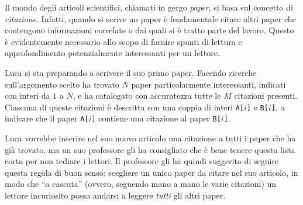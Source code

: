 \usepackage{xcolor}
\usepackage{afterpage}
\usepackage{pifont,mdframed}
\usepackage[bottom]{footmisc}



\newcommand{\inputfile}{\texttt{input.txt}}
\newcommand{\outputfile}{\texttt{output.txt}}

\newenvironment{warning}
  {\par\begin{mdframed}[linewidth=2pt,linecolor=gray]%
    \begin{list}{}{\leftmargin=1cm
                   \labelwidth=\leftmargin}\item[\Large\ding{43}]}
  {\end{list}\end{mdframed}\par}

\newcommand{\funcitem}[2]{\item[$\blacksquare$] \textbf{\large \textsf{Funzione} \texttt{#1}} \vspace{-0.3cm} \begin{center}\begin{tabularx}{\textwidth}{|c|X|} \hline #2 \hline \end{tabularx}\end{center}}



        Il mondo degli articoli scientifici, chiamati in gergo \emph{paper}, si basa sul concetto di \emph{citazione}. Infatti, quando si scrive un paper è fondamentale citare altri paper che contengono informazioni correlate o dai quali si è tratto parte del lavoro. Questo è evidentemente necessario allo scopo di fornire spunti di lettura e approfondimento potenzialmente interessanti per un lettore.

        Luca si sta preparando a scrivere il suo primo paper. Facendo ricerche sull'argomento scelto ha trovato $N$ paper particolarmente interessanti, indicati con interi da $1$ a $N$, e ha catalogato con accuratezza tutte le $M$ citazioni presenti. Ciascuna di queste citazioni è descritta con una coppia di interi \texttt{A[$i$]} e \texttt{B[$i$]}, a indicare che il paper \texttt{A[$i$]} contiene una citazione al paper \texttt{B[$i$]}.

        Luca vorrebbe inserire nel suo nuovo articolo una citazione a tutti i paper che ha già trovato, ma un suo professore gli ha consigliato che è bene tenere questa lista corta per non tediare i lettori. Il professore gli ha quindi suggerito di seguire questa regola di buon senso: scegliere un unico paper da citare nel suo articolo, in modo che ``a cascata'' (ovvero, seguendo mano a mano le varie citazioni) un lettore incuriosito possa andarsi a leggere \emph{tutti} gli altri paper.

